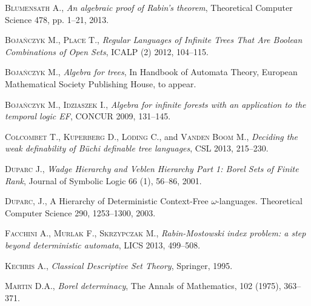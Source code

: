 \begin{thebibliography}{00}

\textsc{Blumensath} A., \emph{An algebraic proof of Rabin's theorem}, Theoretical Computer Science \textsc{478}, pp. 1--21, 2013.

\textsc{Boja\'nczyk} M., \textsc{Place} T., \emph{Regular Languages of Infinite Trees That Are Boolean Combinations of Open Sets}, ICALP (2) \textsc{2012}, 104--115.

\textsc{Boja\'nczyk} M., \emph{Algebra for trees}, In Handbook of Automata Theory, European
Mathematical Society Publishing House, to appear.

\textsc{Boja\'nczyk} M., \textsc{Idziaszek} I., \emph{Algebra for infinite forests with an
application to the temporal logic EF}, CONCUR \textsc{2009}, 131--145.


\textsc{Colcombet} T., \textsc{Kuperberg} D., \textsc{Löding} C., and \textsc{Vanden Boom} M., \emph{Deciding the weak definability of Büchi definable tree languages}, CSL \textsc{2013}, 215--230.


\textsc{Duparc} J., \emph{Wadge Hierarchy and Veblen Hierarchy Part 1: Borel Sets of Finite Rank}, Journal of Symbolic Logic \textsc{66} (1), 56--86, 2001.


\textsc{Duparc}, J., A Hierarchy of Deterministic Context-Free $\omega$-languages.
Theoretical Computer Science \textsc{290}, 1253--1300, 2003.

\textsc{Facchini} A., \textsc{Murlak} F., \textsc{Skrzypczak} M.,  \emph{Rabin-Mostowski index problem: a step beyond deterministic automata}, LICS \textsc{2013}, 499--508.


\textsc{Kechris} A., \emph{Classical Descriptive Set Theory}, Springer, \textsc{1995}.


\textsc{Martin} D.A., \emph{Borel determinacy}, The Annals of Mathematics, \textsc{102} (1975), 363--371.



\end{thebibliography}
